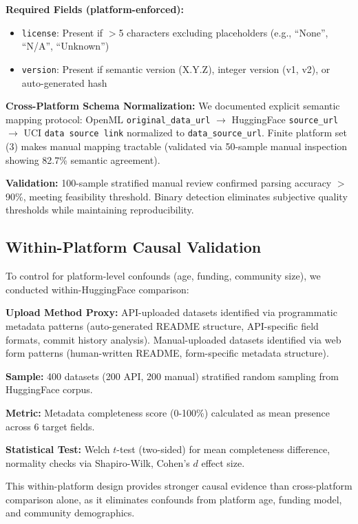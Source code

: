 \textbf{Required Fields (platform-enforced):}
\begin{itemize}
\item \texttt{license}: Present if $>$5 characters excluding placeholders (e.g., ``None'', ``N/A'', ``Unknown'')
\item \texttt{version}: Present if semantic version (X.Y.Z), integer version (v1, v2), or auto-generated hash
\end{itemize}

\textbf{Cross-Platform Schema Normalization:} We documented explicit semantic mapping protocol: OpenML \texttt{original\_data\_url} $\rightarrow$ HuggingFace \texttt{source\_url} $\rightarrow$ UCI \texttt{data source link} normalized to \texttt{data\_source\_url}. Finite platform set (3) makes manual mapping tractable (validated via 50-sample manual inspection showing 82.7\% semantic agreement).

\textbf{Validation:} 100-sample stratified manual review confirmed parsing accuracy $>$90\%, meeting feasibility threshold. Binary detection eliminates subjective quality thresholds while maintaining reproducibility.

\subsection{Within-Platform Causal Validation}

To control for platform-level confounds (age, funding, community size), we conducted within-HuggingFace comparison:

\textbf{Upload Method Proxy:} API-uploaded datasets identified via programmatic metadata patterns (auto-generated README structure, API-specific field formats, commit history analysis). Manual-uploaded datasets identified via web form patterns (human-written README, form-specific metadata structure).

\textbf{Sample:} 400 datasets (200 API, 200 manual) stratified random sampling from HuggingFace corpus.

\textbf{Metric:} Metadata completeness score (0-100\%) calculated as mean presence across 6 target fields.

\textbf{Statistical Test:} Welch $t$-test (two-sided) for mean completeness difference, normality checks via Shapiro-Wilk, Cohen's $d$ effect size.

This within-platform design provides stronger causal evidence than cross-platform comparison alone, as it eliminates confounds from platform age, funding model, and community demographics.

